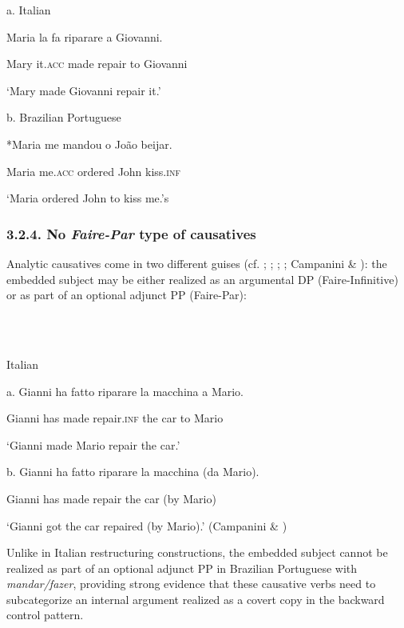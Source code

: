 \documentclass[output=paper]{langsci/langscibook}
\begin{document}
          a.   Italian

    Maria la  fa   riparare a  Giovanni.        

Mary it.\textsc{acc}  made  repair    to Giovanni 

‘Mary made Giovanni repair it.’

b.  Brazilian Portuguese

*Maria me        mandou o João beijar.

Maria   me.\textsc{acc} ordered John    kiss.\textsc{inf}

‘Maria ordered John to kiss me.’s

\subsubsection{ 3.2.4. No \textit{Faire-Par} type of causatives}

Analytic causatives come in two different guises (cf. \citealt{Kayne1975}; \citealt{Huber1980}; \citealt{Burzio1986}; \citealt{Enzinger2010}; Campanini \& \citealt{Pitteroff2012}): the embedded subject may be either realized as an argumental DP  (Faire-Infinitive) or as part of an optional adjunct PP (Faire-Par):

\ea%
    \label{ex:key:18}
    \gll\\
        \\
    \glt
    \z

           Italian

a.  Gianni ha  fatto   riparare    la   macchina a Mario.

Gianni has made repair.\textsc{inf} the car    to Mario 

‘Gianni made Mario repair the car.’

b.  Gianni ha fatto    riparare   la  macchina   (da Mario). 

Gianni has made repair   the car  (by Mario) 

‘Gianni got the car repaired (by Mario).’ (Campanini \& \citealt{Pitteroff2012})

Unlike in Italian restructuring constructions, the embedded subject cannot be realized as part of an optional adjunct PP in Brazilian Portuguese with \textit{mandar/fazer}, providing strong evidence that these causative verbs need to subcategorize an internal argument realized as a covert copy in the backward control pattern. 

\ea%
    \label{ex:key:19}
    \gll\\
        \\
    \glt
    \z
\end{document}
